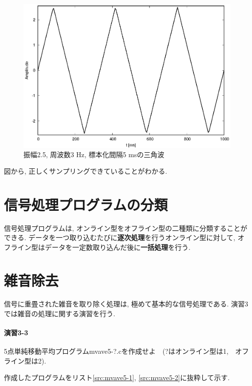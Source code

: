 \documentclass[titlepage]{jsarticle}
\begin{document}
        \begin{figure}[h]
            \centering
            \includegraphics[width=0.8\hsize]{images/triaft.eps}
            \caption{振幅2.5, 周波数3 Hz, 標本化間隔5 msの三角波}
            \label{fig:triaft}
        \end{figure}

        図から, 正しくサンプリングできていることがわかる.

\section{信号処理プログラムの分類}
    信号処理プログラムは, オンライン型をオフライン型の二種類に分類することができる.
    データを一つ取り込むたびに\textbf{逐次処理}を行うオンライン型に対して,
    オフライン型はデータを一定数取り込んだ後に\textbf{一括処理}を行う.

\section{雑音除去}
    信号に重畳された雑音を取り除く処理は, 極めて基本的な信号処理である.
    演習3では雑音の処理に関する演習を行う.

    \paragraph{演習3-3} 5点単純移動平均プログラムmvave5-?.cを作成せよ　(?はオンライン型は1,　オフライン型は2).

        作成したプログラムをリスト\ref{src:mvave5-1}, \ref{src:mvave5-2}に抜粋して示す.
\end{document}
